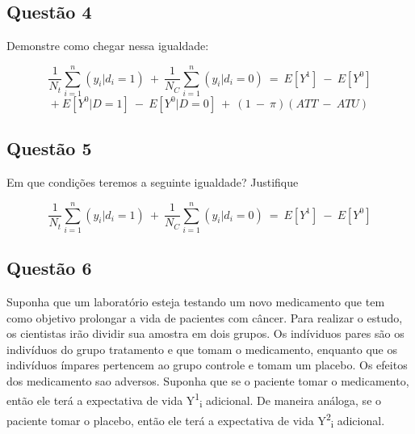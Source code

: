 \documentclass[
]{article}
\begin{document}
\hypertarget{questuxe3o-4}{%
\subsection{Questão 4}\label{questuxe3o-4}}

Demonstre como chegar nessa igualdade:

\[\frac{1}{N_t}\sum_{i=1}^n( y_i | d_i=1)\ +\ \frac{1}{N_C}\sum_{i=1}^n( y_i | d_i=0)\ =\ E[Y^1]\ -\ E[Y^0]\]\newline \[+\ E[Y^0|D=1]\ -\ E[Y^0|D=0]\ +\ (1\ -\ \pi)(ATT\ -\ ATU) \]

\hypertarget{questuxe3o-5}{%
\subsection{Questão 5}\label{questuxe3o-5}}

Em que condições teremos a seguinte igualdade? Justifique

\[\frac{1}{N_t}\sum_{i=1}^n( y_i | d_i=1)\ +\ \frac{1}{N_C}\sum_{i=1}^n( y_i | d_i=0)\ =\ E[Y^1]\ -\ E[Y^0]\]

\hypertarget{questuxe3o-6}{%
\subsection{Questão 6}\label{questuxe3o-6}}

Suponha que um laboratório esteja testando um novo medicamento que tem
como objetivo prolongar a vida de pacientes com câncer. Para realizar o
estudo, os cientistas irão dividir sua amostra em dois grupos. Os
indíviduos pares são os indivíduos do grupo tratamento e que tomam o
medicamento, enquanto que os indivíduos ímpares pertencem ao grupo
controle e tomam um placebo. Os efeitos dos medicamento sao adversos.
Suponha que se o paciente tomar o medicamento, então ele terá a
expectativa de vida Y\textsuperscript{1}\textsubscript{i} adicional. De
maneira análoga, se o paciente tomar o placebo, então ele terá a
expectativa de vida Y\textsuperscript{2}\textsubscript{i} adicional.
\end{document}
